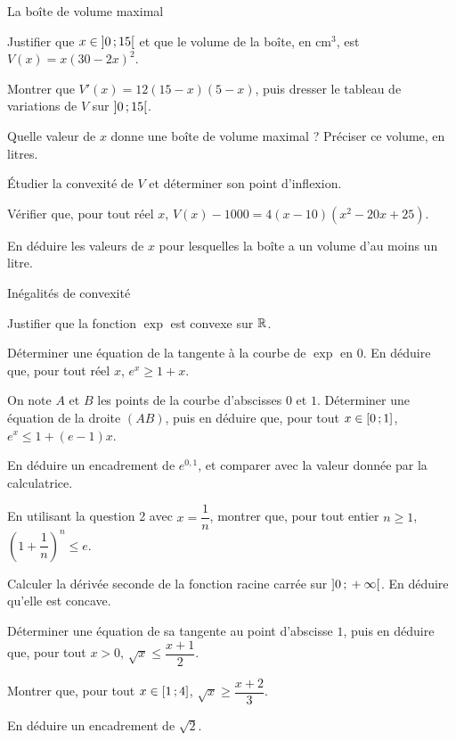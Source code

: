 \begin{exercice}[3]{La boîte de volume maximal}
\begin{questions}
  \item Justifier que $x\in\mathopen{]}0\,{;}\,15\mathclose{[}$ et que le volume de la boîte, en cm$^{3}$, est $V(x)=x(30-2x)^{2}$.
  \item Montrer que $V'(x)=12(15-x)(5-x)$, puis dresser le tableau de variations de $V$ sur $\mathopen{]}0\,{;}\,15\mathclose{[}$.
  \item Quelle valeur de $x$ donne une boîte de volume maximal ? Préciser ce volume, en litres.
  \item Étudier la convexité de $V$ et déterminer son point d'inflexion.
  \item \begin{questions}
      \item Vérifier que, pour tout réel $x$, $V(x)-1000=4(x-10)\left(x^{2}-20x+25\right)$.
      \item En déduire les valeurs de $x$ pour lesquelles la boîte a un volume d'au moins un litre.
    \end{questions}
\end{questions}
\end{exercice}

\begin{exercice}[3]{Inégalités de convexité}
\begin{questions}
  \item Justifier que la fonction $\exp$ est convexe sur $\mathbb{R}$.
  \item Déterminer une équation de la tangente à la courbe de $\exp$ en $0$. En déduire que, pour tout réel $x$,
    $e^{x}\geq1+x$.
  \item On note $A$ et $B$ les points de la courbe d'abscisses $0$ et $1$. Déterminer une équation de la droite $(AB)$,
    puis en déduire que, pour tout $x\in\mathopen{[}0\,{;}\,1\mathclose{]}$, $e^{x}\leq1+(e-1)x$.
  \item En déduire un encadrement de $e^{0,1}$, et comparer avec la valeur donnée par la calculatrice.
  \item En utilisant la question 2 avec $x=\dfrac1n$, montrer que, pour tout entier $n\geq1$,
    $\left(1+\dfrac1n\right)^{n}\leq e$.
\end{questions}
\begin{questions}[resume]
  \item Calculer la dérivée seconde de la fonction racine carrée sur $\mathopen{]}0\,{;}\,+\infty\mathclose{[}$. En déduire qu'elle est concave.
  \item Déterminer une équation de sa tangente au point d'abscisse $1$, puis en déduire que, pour tout $x>0$,
    $\sqrt{x}\leq\dfrac{x+1}{2}$.
  \item Montrer que, pour tout $x\in\mathopen{[}1\,{;}\,4\mathclose{]}$, $\sqrt{x}\geq\dfrac{x+2}{3}$.
  \item En déduire un encadrement de $\sqrt2$.
\end{questions}
\end{exercice}
